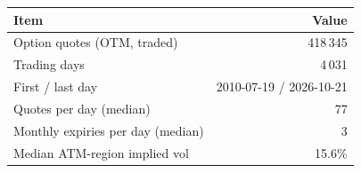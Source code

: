 \begin{tabular}{lr}
\toprule
Item & Value \\
\midrule
Option quotes (OTM, traded) & 418\,345 \\
Trading days & 4\,031 \\
First / last day & 2010-07-19 / 2026-10-21 \\
Quotes per day (median) & 77 \\
Monthly expiries per day (median) & 3 \\
Median ATM-region implied vol & 15.6\% \\
\bottomrule
\end{tabular}
